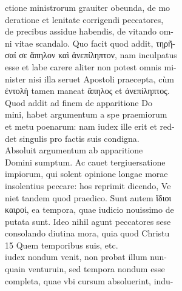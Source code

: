 \documentclass{article}
\begin{document}
\begin{pages}
                ctione ministrorum grauiter obeunda, de mo \\
                deratione et lenitate corrigendi peccatores, \\
                de precibus assidue habendis, de vitando om- \\
                ni vitae scandalo. Quo facit quod addit, τηρῆ- \\
                σαί σε ἄπηλον καὶ ἀνεπίληπτον, nam inculpatus \\
                esse et labe carere aliter non potest omnis mi- \\
                nister nisi illa seruet Apostoli praecepta, cùm \\
                ἐντολὴ tamen maneat ἄπηλος et ἀνεπίληπτος. \\
                Quod addit ad finem de apparitione Do \\
                mini, habet argumentum a spe praemiorum \\
                et metu poenarum: nam iudex ille erit et red- \\
                det singulis pro factis suis condigna. \\
                Absoluit argumentum ab apparitione \\
                Domini sumptum. Ac cauet tergiuersatione \\
                impiorum, qui solent opinione longae morae \\
                insolentius peccare: hos reprimit dicendo, Ve \\
                niet tandem quod praedico. Sunt autem ἵδιοι \\
                καιροί, ea tempora, quae iudicio nouissimo de \\
                putata sunt. Ideo nihil agunt peccatores sese \\
                consolando diutina mora, quia quod Christu \\
                15 Quem temporibus suis, etc. \\
                iudex nondum venit, non probat illum nun- \\
                quain venturuin, sed tempora nondum esse \\
                completa, quae vbi cursum absoluerint, indu- \\

\end{pages}
\end{document}
